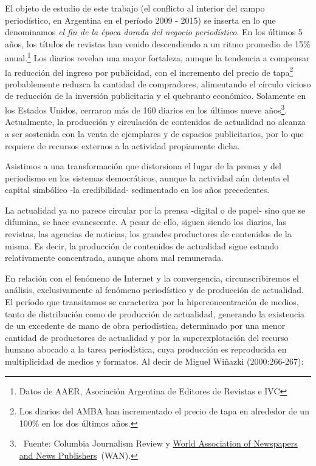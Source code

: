 El objeto de estudio de este trabajo (el conflicto al interior del campo periodístico, en Argentina en el período 2009 - 2015) se inserta en lo que denominamos \emph{el fin de la época dorada del negocio periodístico}. En los últimos 5 años, los títulos de revistas han venido descendiendo a un ritmo promedio de 15\% anual.\footnote{Datos de AAER, Asociación Argentina de Editores de Revistas e IVC} Los diarios revelan una mayor fortaleza, aunque la tendencia a compensar la reducción del ingreso por publicidad, con el incremento del precio de tapa\footnote{Los diarios del AMBA han incrementado el precio de tapa en alrededor de un 100\% en los dos últimos años.} probablemente reduzca la cantidad de compradores, alimentando el círculo vicioso de reducción de la inversión publicitaria y el quebranto económico. Solamente en los Estados Unidos, cerraron más de 160 diarios en los últimos nueve años\footnote{~Fuente: Columbia Journalism Review y \href{http://www.wan-ifra.org/}{World Association of Newspapers and News Publishers}~(WAN).}. Actualmente, la producción y circulación de contenidos de actualidad no alcanza a ser sostenida con la venta de ejemplares y de espacios publicitarios, por lo que requiere de recursos externos a la actividad propiamente dicha.

Asistimos a una transformación que distorsiona el lugar de la prensa y del periodismo en los sistemas democráticos, aunque la actividad aún detenta el capital simbólico -la credibilidad- sedimentado en los años precedentes.

La actualidad ya no parece circular por la prensa -digital o de papel- sino que se difumina, se hace evanescente. A pesar de ello, siguen siendo los diarios, las revistas, las agencias de noticias, los grandes productores de contenidos de la misma. Es decir, la producción de contenidos de actualidad sigue estando relativamente concentrada, aunque ahora mal remunerada.

En relación con el fenómeno de Internet y la convergencia, circunscribiremos el análisis, exclusivamente al fenómeno periodístico y de producción de actualidad. El período que transitamos se caracteriza por la hiperconcentración de medios, tanto de distribución como de producción de actualidad, generando la existencia de un excedente de mano de obra periodística, determinado por una menor cantidad de productores de actualidad y por la superexplotación del recurso humano abocado a la tarea periodística, cuya producción es reproducida en multiplicidad de medios y formatos. Al decir de \textcite[266-277]{@WINAZKI2000PURO} Miguel Wiñazki (2000:266-267):

